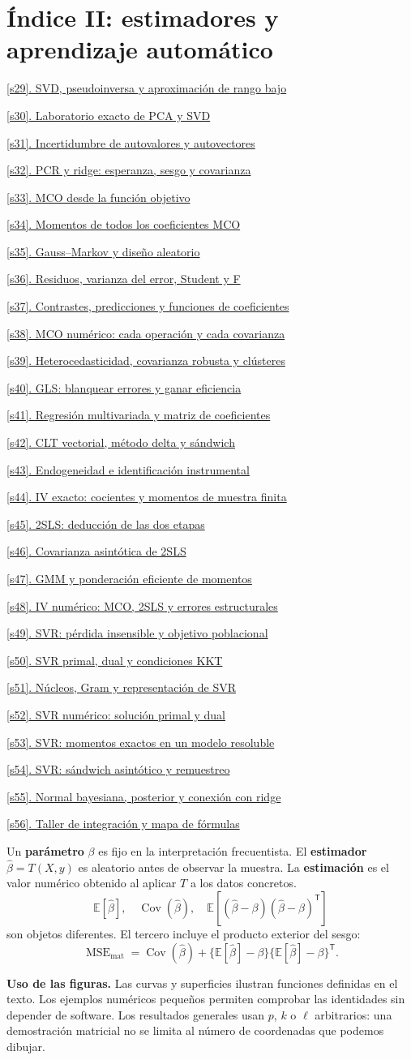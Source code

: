 \documentclass[11pt,a4paper]{article}
\newcommand{\E}{\mathbb E}
\newcommand{\T}{^{\mathsf T}}
\DeclareMathOperator{\Cov}{Cov}
\newcommand{\ruta}[2]{\hyperref[#1]{\ref{#1}. #2}\dotfill\pageref{#1}\par}
\theoremstyle{definition}\newtheorem{definicion}[teorema]{Definición}
\begin{document}
\section*{Índice II: estimadores y aprendizaje automático}
\small
\ruta{s29}{SVD, pseudoinversa y aproximación de rango bajo}
\ruta{s30}{Laboratorio exacto de PCA y SVD}
\ruta{s31}{Incertidumbre de autovalores y autovectores}
\ruta{s32}{PCR y ridge: esperanza, sesgo y covarianza}
\ruta{s33}{MCO desde la función objetivo}
\ruta{s34}{Momentos de todos los coeficientes MCO}
\ruta{s35}{Gauss--Markov y diseño aleatorio}
\ruta{s36}{Residuos, varianza del error, Student y F}
\ruta{s37}{Contrastes, predicciones y funciones de coeficientes}
\ruta{s38}{MCO numérico: cada operación y cada covarianza}
\ruta{s39}{Heterocedasticidad, covarianza robusta y clústeres}
\ruta{s40}{GLS: blanquear errores y ganar eficiencia}
\ruta{s41}{Regresión multivariada y matriz de coeficientes}
\ruta{s42}{CLT vectorial, método delta y sándwich}
\ruta{s43}{Endogeneidad e identificación instrumental}
\ruta{s44}{IV exacto: cocientes y momentos de muestra finita}
\ruta{s45}{2SLS: deducción de las dos etapas}
\ruta{s46}{Covarianza asintótica de 2SLS}
\ruta{s47}{GMM y ponderación eficiente de momentos}
\ruta{s48}{IV numérico: MCO, 2SLS y errores estructurales}
\ruta{s49}{SVR: pérdida insensible y objetivo poblacional}
\ruta{s50}{SVR primal, dual y condiciones KKT}
\ruta{s51}{Núcleos, Gram y representación de SVR}
\ruta{s52}{SVR numérico: solución primal y dual}
\ruta{s53}{SVR: momentos exactos en un modelo resoluble}
\ruta{s54}{SVR: sándwich asintótico y remuestreo}
\ruta{s55}{Normal bayesiana, posterior y conexión con ridge}
\ruta{s56}{Taller de integración y mapa de fórmulas}
\normalsize
\begin{cuidado}
Un \textbf{parámetro} $\beta$ es fijo en la interpretación frecuentista.
El \textbf{estimador} $\widehat\beta=T(X,y)$ es aleatorio antes de observar la
muestra. La \textbf{estimación} es el valor numérico obtenido al aplicar $T$
a los datos concretos.
\[
\E[\widehat\beta],\quad
\Cov(\widehat\beta),\quad
\E[(\widehat\beta-\beta)(\widehat\beta-\beta)\T]
\]
son objetos diferentes. El tercero incluye el producto exterior del sesgo:
\[
\operatorname{MSE}_{\mathrm{mat}}
=\Cov(\widehat\beta)
+\{\E[\widehat\beta]-\beta\}\{\E[\widehat\beta]-\beta\}\T.
\]
\end{cuidado}
\textbf{Uso de las figuras.} Las curvas y superficies ilustran funciones
definidas en el texto. Los ejemplos numéricos pequeños permiten comprobar
las identidades sin depender de software. Los resultados generales usan
$p$, $k$ o $\ell$ arbitrarios: una demostración matricial no se limita al
número de coordenadas que podemos dibujar.
\end{document}
